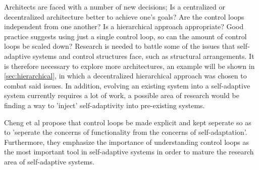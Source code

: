     
    \quad Architects are faced with a number of new decisions;
    Is a centralized or decentralized architecture better to achieve one's goals? Are the control loops independent from one another?
    Is a hierarchical approach appropriate? Good practice suggests using just a single control loop\cite{accidents}, so can the amount of control loops be scaled down?
    Research is needed to battle some of the issues that self-adaptive systems and control structures face, such as structural arrangements. 
    It is therefore necessary to explore more architectures, an example will be shown in \ref{sec:hierarchical}, in which a decentralized hierarchical approach was
    chosen to combat said issues. In addition, evolving an existing system into a self-adaptive system currently requires a lot of work, a possible area of research 
    would be finding a way to 'inject' self-adaptivity into pre-existing systems.
    
    \quad Cheng et al propose that control loops be made explicit and kept seperate so as to 'seperate the concerns of functionality from the concerns of self-adaptation'\cite[p. 16]{Cheng:2009:SES:1573856.1573858}.
    Furthermore, they emphasize the importance of understanding control loops as the most important tool in self-adaptive systems in order to mature the research area of self-adaptive systems.
    
